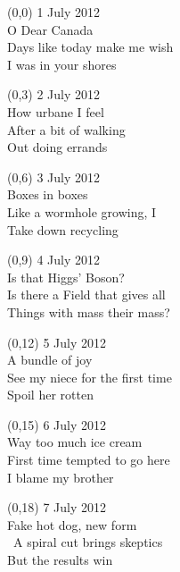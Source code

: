 \documentclass[10pt]{article}
\begin{document}

\begin{textblock}{10}(0,0)
1 July 2012 \\
O Dear Canada \\
Days like today make me wish \\
I was in your shores
\end{textblock}

\begin{textblock}{10}(0,3)
2 July 2012 \\
How urbane I feel \\
After a bit of walking \\
Out doing errands
\end{textblock}

\begin{textblock}{10}(0,6)
3 July 2012 \\
Boxes in boxes \\
Like a wormhole growing, I \\
Take down recycling
\end{textblock}

\begin{textblock}{10}(0,9)
4 July 2012 \\
Is that Higgs' Boson? \\
Is there a Field that gives all \\
Things with mass their mass?
\end{textblock}

\begin{textblock}{10}(0,12)
5 July 2012 \\
A bundle of joy \\
See my niece for the first time \\
Spoil her rotten
\end{textblock}

\begin{textblock}{10}(0,15)
6 July 2012 \\
Way too much ice cream \\
First time tempted to go here \\
I blame my brother
\end{textblock}

\begin{textblock}{10}(0,18)
7 July 2012 \\
Fake hot dog, new form \\\
A spiral cut brings skeptics \\
But the results win
\end{textblock}
\end{document}
